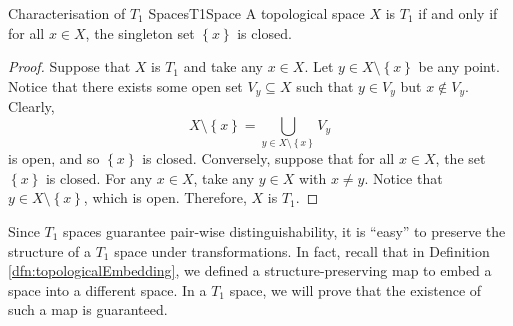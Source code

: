 \documentclass[math]{amznotes}
\theoremstyle{remark}
\begin{document}
\begin{probox}{Characterisation of $T_1$ Spaces}{T1Space}
    A topological space $X$ is $T_1$ if and only if for all $x \in X$, the singleton set $\left\{x\right\}$ is closed.
    \tcblower
    \begin{proof}
        Suppose that $X$ is $T_1$ and take any $x \in X$. Let $y \in X \setminus \left\{x\right\}$ be any point. Notice that there exists some open set $V_y \subseteq X$ such that $y \in V_y$ but $x \notin V_y$. Clearly, 
        \begin{equation*}
            X \setminus \left\{x\right\} = \bigcup_{y \in X \setminus \left\{x\right\}}V_y
        \end{equation*}
        is open, and so $\left\{x\right\}$ is closed. Conversely, suppose that for all $x \in X$, the set $\left\{x\right\}$ is closed. For any $x \in X$, take any $y \in X$ with $x \neq y$. Notice that $y \in X \setminus \left\{x\right\}$, which is open. Therefore, $X$ is $T_1$.
    \end{proof}
\end{probox}
Since $T_1$ spaces guarantee pair-wise distinguishability, it is ``easy'' to preserve the structure of a $T_1$ space under transformations. In fact, recall that in Definition \ref{dfn:topologicalEmbedding}, we defined a structure-preserving map to embed a space into a different space. In a $T_1$ space, we will prove that the existence of such a map is guaranteed.
\end{document}

